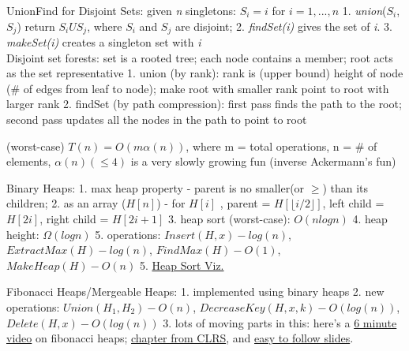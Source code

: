 UnionFind for Disjoint Sets: given \textit{n} singletons: 
$S_i = {i}$ for $i = 1, ..., n$
1. \textit{union}($S_i$, $S_j$) return $S_i U S_j$, where $S_i$ and $S_j$ are disjoint; 
2. \textit{findSet(i)} gives the set of \textit{i}.
3. \textit{makeSet(i)} creates a singleton set with \textit{i}
\\
%
Disjoint set forests: set is a rooted tree; each node contains a member; 
root acts as the set representative
1. union (by rank): rank is (upper bound) height of node 
(\# of edges from leaf to node); make root with smaller rank point to root with larger rank
2. findSet (by path compression): first pass finds the path to the root; 
second pass updates all the nodes in the path to point to root

(worst-case) $T(n) = O(m\alpha(n))$, where m = total operations, n = \# of elements, 
$\alpha(n) (\le 4)$ is a very slowly growing fun (inverse Ackermann's fun)

Binary Heaps: 
1. max heap property - parent is no smaller(or $\ge$) than its children;
2. as an array ($H[n]$) - for $H[i]$ , parent = $H[\lfloor i/2 \rfloor]$, 
left child = $H[2i]$, right child = $H[2i+1]$
3. heap sort (worst-case): $O(nlogn)$
4. heap height: $\Omega(logn)$
5. operations: $Insert(H, x)-log(n)$, $ExtractMax(H)-log(n)$, 
$FindMax(H)-O(1)$, $MakeHeap(H)-O(n)$
5. \href{https://www.mimuw.edu.pl/~erykk/algovis/heapsort.html}{Heap Sort Viz.}

Fibonacci Heaps/Mergeable Heaps: 
1. implemented using binary heaps
2. new operations: $Union(H_1,H_2)-O(n)$, $DecreaseKey(H,x,k)-O(log(n))$, 
$Delete(H,x)-O(log(n))$
3. lots of moving parts in this: here's a \href{https://www.youtube.com/watch?v=0vsX3ZQFREM}{6 minute video} on fibonacci heaps; 
\href{https://www.utsc.utoronto.ca/~atafliovich/cscb63/content/week10/clrs_fibonacci_chapter.pdf}{chapter from CLRS}, 
and \href{https://www.cs.princeton.edu/~wayne/teaching/fibonacci-heap.pdf}{easy to follow slides}.

% 
